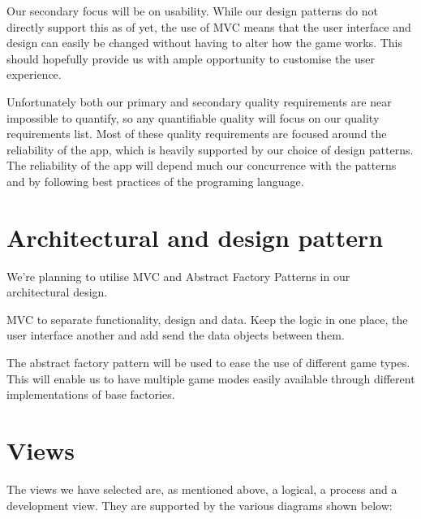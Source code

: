 \documentclass[12pt, a4paper]{article}
\begin{document}
Our secondary focus will be on usability. While our design patterns do not directly support this as of yet, the use of MVC means that the user interface and design can easily be changed without having to alter how the game works. This should hopefully provide us with ample opportunity to customise the user experience.

Unfortunately both our primary and secondary quality requirements are near impossible to quantify, so any quantifiable quality will focus on our quality requirements list. Most of these quality requirements are focused around the reliability of the app, which is heavily supported by our choice of design patterns. The reliability of the app will depend much our concurrence with the patterns and by following best practices of the programing language. 


\section{Architectural and design pattern}
We’re planning to utilise MVC and Abstract Factory Patterns in our architectural design. 

MVC to separate functionality, design and data. Keep the logic in one place, the user interface another and add send the data objects between them. 

The abstract factory pattern will be used to ease the use of different game types. This will enable us to have multiple game modes easily available through different implementations of base factories. 

\section{Views}
The views we have selected are, as mentioned above, a logical, a process and a development view. They are supported by the various diagrams shown below:
\end{document}
